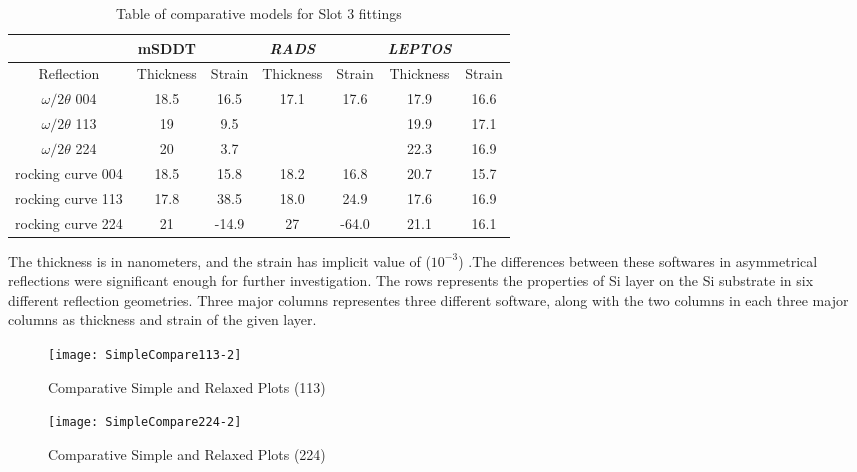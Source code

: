 \begin{table}[ht]
\caption{Table of comparative models for Slot 3 fittings}
\label{SiGeSlot3-Fits}
\centering
\begin{tabular}{c|cc|cc|cc}
& mSDDT & &{\textit{RADS}} & & {\textit{LEPTOS}} \\
\hline
Reflection	&	Thickness	& 	Strain	&	Thickness	&	Strain	&	Thickness	&	Strain	\\
\hline
$\omega/2\theta$ 004&  18.5	&	16.5	& 17.1			& 17.6		& 17.9		&   	16.6  	\\
$\omega/2\theta$ 113&19	&	9.5	& \textendash\ 	&\textendash	& 19.9	&     17.1	\\
$\omega/2\theta$ 224 &20	&	3.7	&\textendash 	&\textendash 	&22.3		&    16.9	\\
rocking curve 004	&  18.5	&	15.8	&18.2			& 16.8		&20.7		&     15.7	\\
rocking curve 113	& 17.8		&	38.5	&18.0			& 24.9		&17.6		&	16.9	\\
rocking curve 224	& 21		&	-14.9	&27			&-64.0		&21.1		&	16.1	\\
\end{tabular}
\end{table}
The thickness is in nanometers, and the strain has implicit value of   ($10^{-3}$) .The differences between these softwares in asymmetrical reflections were significant enough for further investigation.  The rows represents the properties of Si layer on the Si substrate in six different reflection geometries.  Three major columns representes three different software, along with the two columns in each three major columns as thickness and strain of the given layer.

\begin{figure}[ht]%
\caption{Comparative Simple and Relaxed Plots (113)}
\label{CSRP113}
\begin{minipage}{0.85\linewidth}
\texttt{[image: SimpleCompare113-2]}
\end{minipage}
\end{figure}

\begin{figure}[ht]%
\caption{Comparative Simple and Relaxed Plots (224)}
\label{CSRP224}
\begin{minipage}{0.85\linewidth}
\texttt{[image: SimpleCompare224-2]}
\end{minipage}
\end{figure}

